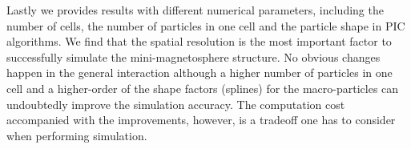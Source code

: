 Lastly we provides results with different numerical parameters, including the number of cells, the number of particles in one cell and the particle shape in PIC algorithms. We find that the spatial resolution is the most important factor to successfully simulate the mini-magnetosphere structure. No obvious changes happen in the general interaction although a higher number of particles in one cell and a higher-order of the shape factors (splines) for the macro-particles can undoubtedly improve the simulation accuracy. The computation cost accompanied with the improvements, however, is a tradeoff one has to consider when performing simulation.
